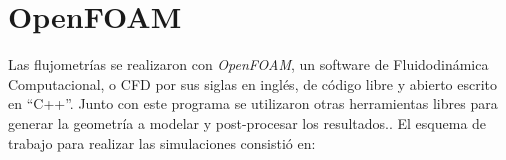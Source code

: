 





%


\section{OpenFOAM}\label{sec:3_openfoam}
%
Las flujometrías se realizaron con \emph{OpenFOAM}, un software de
Fluidodinámica Computacional, o CFD por sus siglas en inglés, de código libre y
abierto escrito en ``C++''.
%
%
Junto con este programa se utilizaron otras herramientas libres para generar la
geometría a modelar y post-procesar los resultados..
%
El esquema de trabajo para realizar las simulaciones consistió en:

